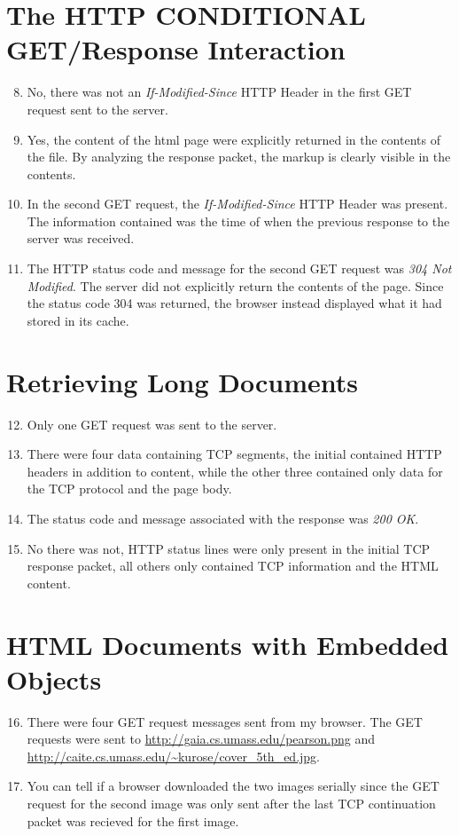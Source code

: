 \documentclass[12pt]{article}
\begin{document}
\section{The HTTP CONDITIONAL GET/Response Interaction}
\begin{enumerate}
		\setcounter{enumi}{7}
	\item{No, there was not an \textit{If-Modified-Since} HTTP Header in the first GET request sent to the server.}
	\item{Yes, the content of the html page were explicitly returned in the contents of the file. By analyzing the response packet, the markup is clearly visible in the contents.}
	\item{In the second GET request, the \textit{If-Modified-Since} HTTP Header was present. The information contained was the time of when the previous response to the server was received.}
	\item{The HTTP status code and message for the second GET request was \textit{304 Not Modified}. The server did not explicitly return the contents of the page. Since the status code 304 was returned, the browser instead displayed what it had stored in its cache.}
\end{enumerate}

\section{Retrieving Long Documents}
\begin{enumerate}
		\setcounter{enumi}{11}
	\item{Only one GET request was sent to the server.}
	\item{There were four data containing TCP segments, the initial contained HTTP headers in addition to content, while the other three contained only data for the TCP protocol and the page body.}
	\item{The status code and message associated with the response was \textit{200 OK}.}
	\item{No there was not, HTTP status lines were only present in the initial TCP response packet, all others only contained TCP information and the HTML content.}
\end{enumerate}

\section{HTML Documents with Embedded Objects}
\begin{enumerate}
		\setcounter{enumi}{15}
	\item{There were four GET request messages sent from my browser. The GET requests were sent to \url{http://gaia.cs.umass.edu/pearson.png} and \url{http://caite.cs.umass.edu/~kurose/cover_5th_ed.jpg}.}
	\item{You can tell if a browser downloaded the two images serially since the GET request for the second image was only sent after the last TCP continuation packet was recieved for the first image.}
\end{enumerate}
\end{document}
